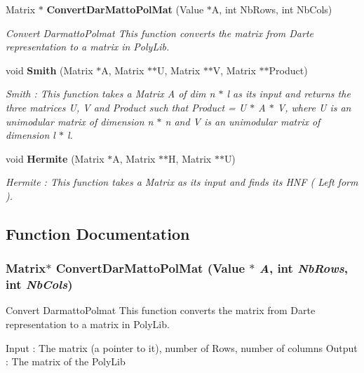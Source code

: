 \begin{CompactItemize}
Matrix $\ast$ {\bf Convert\-Dar\-Matto\-Pol\-Mat} (Value $\ast$A, int Nb\-Rows, int Nb\-Cols)
\begin{CompactList}\small\item\em Convert Darmatto\-Polmat This function converts the matrix from Darte representation to a matrix in Poly\-Lib.\item\end{CompactList}\item 
void {\bf Smith} (Matrix $\ast$A, Matrix $\ast$$\ast$U, Matrix $\ast$$\ast$V, Matrix $\ast$$\ast$Product)
\begin{CompactList}\small\item\em Smith : This function takes a Matrix A of dim n $\ast$ l as its input and returns the three matrices U, V and Product such that Product = U $\ast$ A $\ast$ V, where U is an unimodular matrix of dimension n $\ast$ n and V is an unimodular matrix of dimension l $\ast$ l.\item\end{CompactList}\item 
void {\bf Hermite} (Matrix $\ast$A, Matrix $\ast$$\ast$H, Matrix $\ast$$\ast$U)
\begin{CompactList}\small\item\em Hermite : This function takes a Matrix as its input and finds its HNF ( Left form ).\item\end{CompactList}\end{CompactItemize}


\subsection{Function Documentation}
\subsubsection{\setlength{\rightskip}{0pt plus 5cm}Matrix$\ast$ Convert\-Dar\-Matto\-Pol\-Mat (Value $\ast$ {\em A}, int {\em Nb\-Rows}, int {\em Nb\-Cols})\hspace{0.3cm}{\tt  [static]}}\label{NormalForms_8c_a14}


Convert Darmatto\-Polmat This function converts the matrix from Darte representation to a matrix in Poly\-Lib.

Input : The matrix (a pointer to it), number of Rows, number of columns Output : The matrix of the Poly\-Lib 

